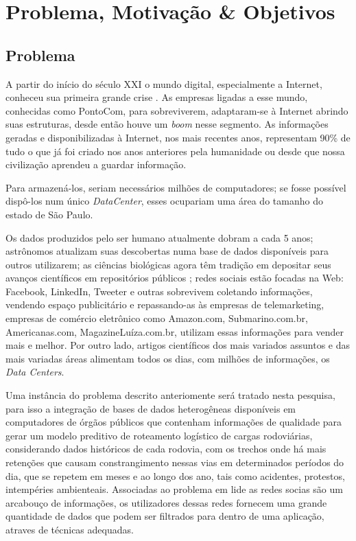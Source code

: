 \chapter{Problema, Motivação \& Objetivos}\label{intro}

\section{ Problema}\label{intro:problem}

A partir do início do século XXI o mundo digital, especialmente a Internet, conheceu sua primeira grande crise \cite{Quadros2005}.
As empresas ligadas a esse mundo, conhecidas como PontoCom, para sobreviverem, adaptaram-se à Internet abrindo suas estruturas, desde então houve um \textit{boom} nesse 
segmento.
As informações geradas e disponibilizadas à Internet, nos mais recentes anos, representam 90\% de tudo o que já foi criado nos anos anteriores pela humanidade ou desde que 
nossa civilização aprendeu a guardar informação.

Para armazená-los, seriam necessários milhões de computadores; se fosse possível dispô-los num único \textit{DataCenter}, esses ocupariam 
uma área do tamanho do estado de São Paulo.

Os dados produzidos pelo ser humano atualmente dobram a cada 5 anos; astrônomos atualizam suas descobertas numa base de dados disponíveis para outros utilizarem; as ciências biológicas agora têm tradição 
em depositar seus avanços científicos em repositórios públicos \cite{bigdataMedicina}; redes sociais estão focadas na Web: Facebook, LinkedIn, Tweeter e outras 
sobrevivem coletando informações, vendendo espaço publicitário e repassando-as às empresas de telemarketing, empresas de comércio eletrônico como 
Amazon.com, Submarino.com.br, Americanas.com, MagazineLuíza.com.br, utilizam essas informações para vender mais e melhor. 
Por outro lado, artigos científicos dos mais variados assuntos e das mais variadas áreas alimentam todos os dias, com milhões de 
informações, os \textit{Data Centers}.

Uma instância do problema descrito anteriomente será tratado nesta pesquisa, para isso a integração de bases de dados heterogêneas disponíveis em computadores de órgãos públicos 
que contenham informações de qualidade para gerar um modelo preditivo de roteamento logístico de cargas rodoviárias, considerando dados históricos de cada rodovia, com os trechos onde há mais 
retenções que causam constrangimento nessas vias em determinados períodos do dia, que se repetem em meses e ao longo dos ano, tais como acidentes, protestos, intempéries ambienteais.
Associadas ao problema em lide as redes socias são um arcabouço de informações, os utilizadores dessas redes fornecem uma grande quantidade de dados que podem ser filtrados para 
dentro de uma aplicação, atraves de técnicas adequadas.

